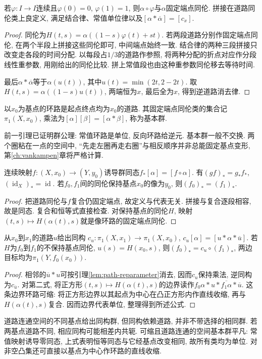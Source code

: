 \begin{lemma}\label{lem:path-reparameter}
若$\varphi:I\to I$连续且$\varphi(0)=0$, $\varphi(1)=1$, 则$\alpha\circ\varphi$与$\alpha$固定端点同伦. 拼接在道路同伦类上良定义, 满足结合律、常值单位律以及$[\alpha*\overline\alpha]=[c_x]$.
\end{lemma}
\begin{proof}
同伦为$H(t,s)=\alpha((1-s)\varphi(t)+st)$. 若两段道路分别作固定端点同伦, 在两个半段上拼接这些同伦即可, 中间端点始终一致. 结合律的两种三段拼接只改变走各段的时间分配. 以每段占$1/3$的道路作参照, 将两种分配的折点对应作分段线性重参数, 用刚给出的同伦比较. 拼上常值段也由这种重参数同伦移去等待时间.

最后$\alpha*\overline\alpha$等于$\alpha(u(t))$, 其中$u(t)=\min(2t,2-2t)$. 取$H(t,s)=\alpha((1-s)u(t))$, 两端恒为$x$, 最后全为$x$, 得到逆道路消去律.
\end{proof}

\begin{definition}
以$x_0$为基点的环路是起点终点均为$x_0$的道路. 其固定端点同伦类的集合记$\pi_1(X,x_0)$, 乘法为$[\alpha][\beta]=[\alpha*\beta]$, 称为基本群.
\end{definition}
前一引理已证明群公理: 常值环路是单位, 反向环路给逆元. 基本群一般不交换. 两个圈粘在一点的空间中, “先走左圈再走右圈”与相反顺序并非总能固定基点变形, 第\ref{ch:vankampen}章将严格计算.

\begin{proposition}\label{thm:pi1-functor}
连续映射$f:(X,x_0)\to(Y,y_0)$诱导群同态$f_*[\alpha]=[f\circ\alpha]$. 有$(gf)_*=g_*f_*$, $(\operatorname{id}_X)_*=\operatorname{id}$. 若$f_0,f_1$间的同伦保持基点$x_0$的像为$y_0$, 则$(f_0)_*=(f_1)_*$.
\end{proposition}
\begin{proof}
把道路同伦与$f$复合仍固定端点, 故定义与代表无关. 拼接与复合逐段相容, 故是同态. 复合和恒等式直接检查. 对保持基点的同伦$H$, 映射$(t,s)\mapsto H(\alpha(t),s)$就是像环路的固定端点同伦.
\end{proof}

\begin{proposition}\label{thm:basepoint-change}
从$x_0$到$x_1$的道路$u$给出同构
$c_u:\pi_1(X,x_1)\to\pi_1(X,x_0)$,
$c_u[\alpha]=[u*\alpha*\overline u]$.
若$H$为$f_0$到$f_1$的不保持基点同伦, $u(s)=H(x_0,s)$, 则$(f_0)_*=c_u\circ(f_1)_*$, 两边目标均为$\pi_1(Y,f_0(x_0))$.
\end{proposition}
\begin{proof}
相邻的$\overline u*u$可按引理\ref{lem:path-reparameter}消去, 因而$c_u$保持乘法, 逆同构为$c_{\overline u}$. 对第二式, 将正方形$(t,s)\mapsto H(\alpha(t),s)$的边界读作$f_0\alpha*u*\overline{f_1\alpha}*\overline u$. 这条边界环路可缩: 将正方形边界以其起点为中心在凸正方形内作直线收缩, 再与$H(\alpha(t),s)$复合. 因而边界代表单位, 整理得到所述公式.
\end{proof}
道路连通空间的不同基点给出同构群, 但同构依赖道路, 并非不带选择的相同群. 若两基点道路不同, 相应同构可能相差内共轭. 可缩且道路连通的空间基本群平凡: 常值映射诱导零同态, 上式表明恒等同态与它经基点改变相同, 故所有类均为单位. 对非空凸集还可直接以基点为中心作环路的直线收缩.

